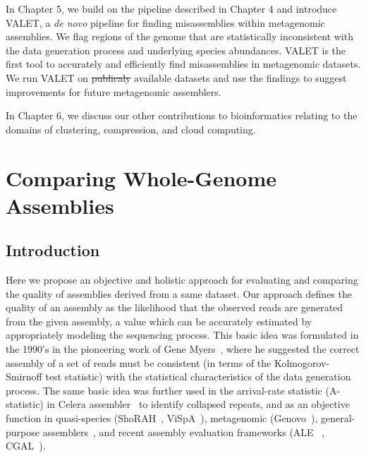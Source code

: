 \documentclass[12pt,\mydriver]{thesis}
\providecommand{\DIFaddtex}[1]{{\protect\color{blue}\uwave{#1}}} %
\providecommand{\DIFdeltex}[1]{{\protect\color{red}\sout{#1}}}                      %
\providecommand{\DIFaddbegin}{} %
\providecommand{\DIFaddend}{} %
\providecommand{\DIFdelbegin}{} %
\providecommand{\DIFdelend}{} %
\providecommand{\DIFadd}[1]{\texorpdfstring{\DIFaddtex{#1}}{#1}} %
\providecommand{\DIFdel}[1]{\texorpdfstring{\DIFdeltex{#1}}{}} %
\begin{document}
In Chapter 5, we build on the pipeline described in Chapter 4 and introduce VALET, a \emph{de novo} pipeline for finding mis­assemblies within metagenomic assemblies.
We flag regions of the genome that are statistically inconsistent with the data generation process and underlying species abundances.
VALET is the first tool to accurately and efficiently find mis­assemblies in metagenomic datasets.
We run VALET on \DIFdelbegin \DIFdel{publicaly }\DIFdelend \DIFaddbegin \DIFadd{publicly }\DIFaddend available datasets and use the findings to suggest improvements for future metagenomic assemblers.

In Chapter 6, we discuss our other contributions to bioinformatics relating to the domains of clustering, compression, and cloud computing.
\clearpage{}
\clearpage{}
\renewcommand{\thechapter}{2}
\chapter{Comparing Whole-Genome Assemblies}

\section{Introduction}




Here we propose an objective and holistic approach for evaluating and
comparing the quality of assemblies derived from a same dataset.  Our
approach defines the quality of an assembly as the likelihood that the
observed reads are generated from the given assembly, a value which can
be accurately estimated by appropriately modeling the sequencing
process.  This basic idea was formulated in the 1990's in the
pioneering work of Gene Myers~\cite{myers1995}, where he suggested
the correct assembly of a set of reads must be consistent (in terms of
the Kolmogorov-Smirnoff test statistic) with the statistical
characteristics of the data generation process.  The same basic idea
was further used in the arrival-rate statistic (A-statistic) in Celera
assembler~\cite{CeleraAssembler} to identify collapsed repeats, and
as an objective function in quasi-species (ShoRAH~\cite{SHORAH},
ViSpA~\cite{VISPA}), metagenomic (Genovo~\cite{genovo2011}),
general-purpose assemblers~\cite{medvedev2009maximum}, and recent assembly
evaluation frameworks (ALE ~\cite{clark2013ale}, CGAL~\cite{rahman2013cgal}).
\end{document}
